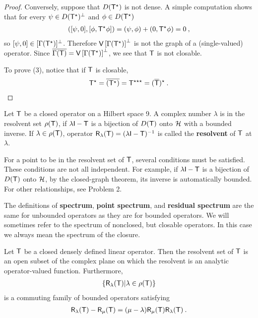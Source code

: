 \begin{proof}
Conversely, suppose that $D(\mathsf{T}^\star)$ is not dense. A simple computation shows that for every $ \psi \in D(\mathsf{T}^\star)^\bot$ and $\phi \in D(\mathsf{T}^\star)$
\begin{align}
    \left( [\psi, 0], [\phi, \mathsf{T}^\star \phi ] \right) = (\psi, \phi) + (0, \mathsf{T}^\star \phi) = 0 \:,
\end{align}
so $[\psi,0] \in [\Gamma(\mathsf{T}^\star)]^\bot$. Therefore $\mathsf{V}\left[\Gamma(\mathsf{T}^\star)\right]^\bot$ is not the graph of a (single-valued) operator. Since $\overline{\Gamma(\mathsf{T})} = \mathsf{V}\left[\Gamma(\mathsf{T}^\star)\right]^\bot$, we see that $\mathsf{T}$ is not closable.

To prove (3), notice that if $\mathsf{T}$ is closable,
\begin{align}
    \mathsf{T}^\star = \overline{(\mathsf{T}^\star)} = \mathsf{T}^{\star \star \star} =(\overline{\mathsf{T}})^\star \:.
\end{align}
\end{proof}

\begin{definition}
Let $\mathsf{T}$ be a closed operator on a Hilbert space 9. A complex number $\lambda$ is in the resolvent set $\rho(\mathsf{T})$, if $ \lambda \mathsf{I} - \mathsf{T}$ is a bijection of $D(\mathsf{T})$ onto $\mathcal{H}$ with a bounded inverse. If $\lambda \in \rho(\mathsf{T})$, operator $\mathsf{R}_\lambda(\mathsf{T}) = (\lambda \mathsf{I} - \mathsf{T})^{-1}$ is called the \textbf{resolvent} of $\mathsf{T}$
at $\lambda$.
\end{definition}

For a point to be in the resolvent set of $\mathsf{T}$, several conditions must be satisfied. These conditions are not all independent. For example, if $ \lambda \mathsf{I} - \mathsf{T}$ is a bijection of $D(\mathsf{T})$ onto $\mathcal{H}$, by the closed-graph theorem, its inverse is automatically bounded. For other relationships, see Problem 2.

The definitions of \textbf{spectrum}, \textbf{point spectrum}, and \textbf{residual spectrum} are the same for unbounded operators as they are for bounded operators. We will sometimes refer to the spectrum of nonclosed, but closable operators. In this case we always mean the spectrum of the closure.

\begin{theorem}
Let $\mathsf{T}$ be a closed densely defined linear operator. Then
the resolvent set of $\mathsf{T}$ is an open subset of the complex plane on which the resolvent is an analytic operator-valued function. Furthermore,
\begin{align}
    \left \lbrace \mathsf{R}_\lambda (\mathsf{T}) | \lambda \in \rho(\mathsf{T}) \right \rbrace
\end{align}
is a commuting family of bounded operators satisfying
\begin{align}
   \mathsf{R}_\lambda(\mathsf{T}) - \mathsf{R}_\mu (\mathsf{T}) = (\mu - \lambda) \mathsf{R}_\mu (\mathsf{T}) \mathsf{R}_\lambda (\mathsf{T}) \:. 
\end{align}

\end{theorem}

